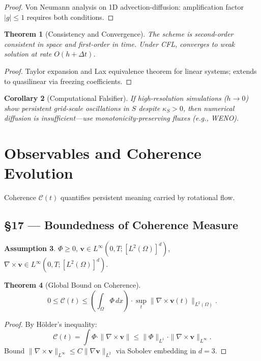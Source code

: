 \documentclass[11pt]{article}
\newtheorem{theorem}{Theorem}[section]
\newtheorem{corollary}[theorem]{Corollary}
\theoremstyle{definition}
\newtheorem{assumption}[theorem]{Assumption}
\theoremstyle{remark}
\newcommand{\vect}[1]{\bm{#1}}
\begin{document}
\begin{proof}
Von Neumann analysis on 1D advection-diffusion: amplification factor $|g| \le 1$ requires both conditions.
\end{proof}

\begin{theorem}[Consistency and Convergence]
The scheme is second-order consistent in space and first-order in time. Under CFL, converges to weak solution at rate $O(h + \Delta t)$.
\end{theorem}

\begin{proof}
Taylor expansion and Lax equivalence theorem for linear systems; extends to quasilinear via freezing coefficients.
\end{proof}

\begin{corollary}[Computational Falsifier]
If high-resolution simulations ($h \to 0$) show persistent grid-scale oscillations in $S$ despite $\kappa_S > 0$, then numerical diffusion is insufficient—use monotonicity-preserving fluxes (e.g., WENO).
\end{corollary}


\section{Observables and Coherence Evolution}
Coherence $\mathcal{C}(t)$ quantifies persistent meaning carried by rotational flow.

\subsection*{§17 — Boundedness of Coherence Measure}

\begin{assumption}
\label{ass:coherence_bound}
$\Phi \ge 0$, $\vect{v} \in L^\infty(0,T; [L^2(\Omega)]^d)$, $\nabla \times \vect{v} \in L^\infty(0,T; [L^2(\Omega)]^d)$.
\end{assumption}

\begin{theorem}[Global Bound on Coherence]
\[
0 \le \mathcal{C}(t) \le \left( \int_\Omega \Phi\,dx \right) \cdot \sup_t \|\nabla \times \vect{v}(t)\|_{L^2(\Omega)}.
\]
\end{theorem}

\begin{proof}
By Hölder’s inequality:
\[
\mathcal{C}(t) = \int \Phi \cdot \|\nabla \times \vect{v}\| \le \|\Phi\|_{L^1} \cdot \|\nabla \times \vect{v}\|_{L^\infty}.
\]
Bound $\|\nabla \times \vect{v}\|_{L^\infty} \le C \|\nabla \vect{v}\|_{L^2}$ via Sobolev embedding in $d=3$.
\end{proof}
\end{document}
